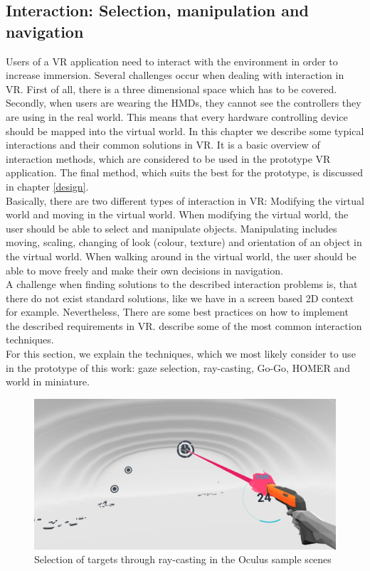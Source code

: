 \subsection{Interaction: Selection, manipulation and navigation}
\label{interaction-state-of-art}
Users of a VR application need to interact with the environment in order to increase immersion. Several challenges occur when dealing with interaction in VR. First of all, there is a three dimensional space which has to be covered. Secondly, when users are wearing the HMDs, they cannot see the controllers they are using in the real world. This means that every hardware controlling device should be mapped into the virtual world. In this chapter we describe some typical interactions and their common solutions in VR. It is a basic overview of interaction methods, which are considered to be used in the prototype VR application. The final method, which suits the best for the prototype, is discussed in chapter \ref{design}.\\
Basically, there are two different types of interaction in VR: Modifying the virtual world and moving in the virtual world. When modifying the virtual world, the user should be able to select and manipulate objects. Manipulating includes moving, scaling, changing of look (colour, texture) and orientation of an object in the virtual world. When walking around in the virtual world, the user should be able to move freely and make their own decisions in navigation. \cite{Dorner.2013}\\
A challenge when finding solutions to the described interaction problems is, that there do not exist standard solutions, like we have in a screen based 2D context for example. Nevertheless, There are some best practices on how to implement the described requirements in VR. \cite{Dorner.2013} describe some of the most common interaction techniques. \\For this section, we explain the techniques, which we most likely consider to use in the prototype of this work: gaze selection, ray-casting, Go-Go, HOMER and world in miniature.
\begin{figure}[]
	\includegraphics[width=14cm]{kapitel/ray-casting.jpg}
	\centering
	\caption{Selection of targets through ray-casting in the Oculus sample scenes \cite{Goldstone.2015}}
	\label{fig:ray-casting}
\end{figure}

